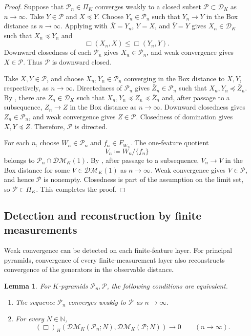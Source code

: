 \documentclass[10pt,a4paper]{amsart}
\newtheorem{lemma}[theorem]{Lemma}
\newcommand{\DK}{\mathcal D_K}
\newcommand{\DM}{\mathcal{DM}}
\begin{document}
\begin{proof}
Suppose that $\mathcal P_n\in\Pi_K$ converges weakly to a closed subset $\mathcal P\subset\DK$ as $n\to\infty$. Take $Y\in\mathcal P$ and $X\preceq Y$. Choose $Y_n\in\mathcal P_n$ such that $Y_n\to Y$ in the Box distance as $n\to\infty$. Applying  with $\bar X=Y_n$, $Y=X$, and $\bar Y=Y$ gives $X_n\in\DK$ such that $X_n\preceq Y_n$ and
\[
\Box(X_n,X)\leq\Box(Y_n,Y).
\]
Downward closedness of each $\mathcal P_n$ gives $X_n\in\mathcal P_n$, and weak convergence gives $X\in\mathcal P$. Thus $\mathcal P$ is downward closed.

Take $X,Y\in\mathcal P$, and choose $X_n,Y_n\in\mathcal P_n$ converging in the Box distance to $X,Y$, respectively, as $n\to\infty$. Directedness of $\mathcal P_n$ gives $\bar Z_n\in\mathcal P_n$ such that $X_n,Y_n\preceq\bar Z_n$. By , there are $Z_n\in\DK$ such that $X_n,Y_n\preceq Z_n\preceq\bar Z_n$ and, after passage to a subsequence, $Z_n\to Z$ in the Box distance as $n\to\infty$. Downward closedness gives $Z_n\in\mathcal P_n$, and weak convergence gives $Z\in\mathcal P$. Closedness of domination \cite[Theorem~4.16]{gds1} gives $X,Y\preceq Z$. Therefore, $\mathcal P$ is directed.

For each $n$, choose $W_n\in\mathcal P_n$ and $f_n\in F_{W_n}$. The one-feature quotient
\[
V_n\coloneqq W_n/\{f_n\}
\]
belongs to $\mathcal P_n\cap\DM_K(1)$. By , after passage to a subsequence, $V_n\to V$ in the Box distance for some $V\in\DM_K(1)$ as $n\to\infty$. Weak convergence gives $V\in\mathcal P$, and hence $\mathcal P$ is nonempty. Closedness is part of the assumption on the limit set, so $\mathcal P\in\Pi_K$. This completes the proof.
\end{proof}

\subsection{Detection and reconstruction by finite measurements}
\label{subsec:pyramid-reconstruction}

Weak convergence can be detected on each finite-feature layer. For principal pyramids, convergence of every finite-measurement layer also reconstructs convergence of the generators in the observable distance.

\begin{lemma}
\label{lem:K-pyramid-measurements}
For $K$-pyramids $\mathcal P_n,\mathcal P$, the following conditions are equivalent.
\begin{enumerate}
\item The sequence $\mathcal P_n$ converges weakly to $\mathcal P$ as $n\to\infty$.
\item For every $N\in\mathbb N$,
\[
(\Box)_H(\DM_K(\mathcal P_n;N),\DM_K(\mathcal P;N))\longrightarrow0\qquad(n\to\infty).
\]
\end{enumerate}
\end{lemma}
\end{document}
